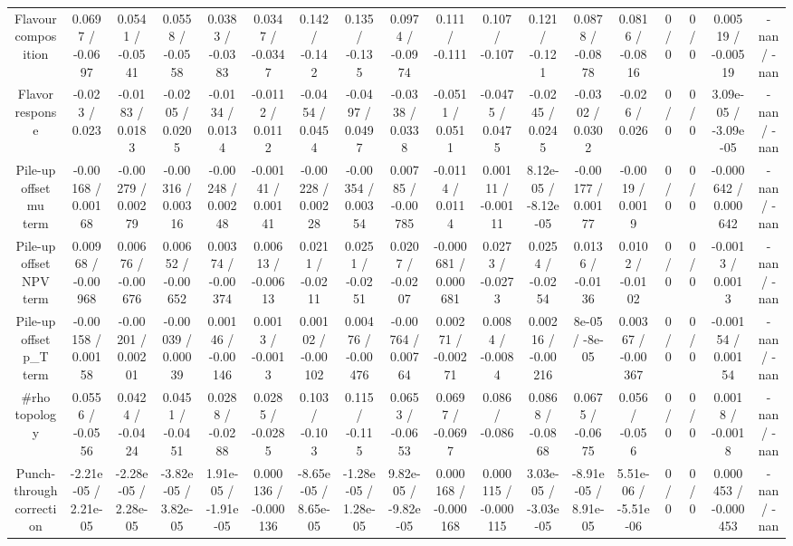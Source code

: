\documentclass[10pt]{article}
\begin{document}
\begin{table}[htbp]
\begin{center}
\begin{tabular}{|c|c|c|c|c|c|c|c|c|c|c|c|c|c|c|c|c|c|}
  Flavour composition & 0.0697 / -0.0697 & 0.0541 / -0.0541 & 0.0558 / -0.0558 & 0.0383 / -0.0383 & 0.0347 / -0.0347 & 0.142 / -0.142 & 0.135 / -0.135 & 0.0974 / -0.0974 & 0.111 / -0.111 & 0.107 / -0.107 & 0.121 / -0.121 & 0.0878 / -0.0878 & 0.0816 / -0.0816 & 0 / 0 & 0 / 0 & 0.00519 / -0.00519 & -nan / -nan \\ 
  Flavor response & -0.023 / 0.023 & -0.0183 / 0.0183 & -0.0205 / 0.0205 & -0.0134 / 0.0134 & -0.0112 / 0.0112 & -0.0454 / 0.0454 & -0.0497 / 0.0497 & -0.0338 / 0.0338 & -0.0511 / 0.0511 & -0.0475 / 0.0475 & -0.0245 / 0.0245 & -0.0302 / 0.0302 & -0.026 / 0.026 & 0 / 0 & 0 / 0 & 3.09e-05 / -3.09e-05 & -nan / -nan \\ 
  Pile-up offset mu term & -0.00168 / 0.00168 & -0.00279 / 0.00279 & -0.00316 / 0.00316 & -0.00248 / 0.00248 & -0.00141 / 0.00141 & -0.00228 / 0.00228 & -0.00354 / 0.00354 & 0.00785 / -0.00785 & -0.0114 / 0.0114 & 0.00111 / -0.00111 & 8.12e-05 / -8.12e-05 & -0.00177 / 0.00177 & -0.0019 / 0.0019 & 0 / 0 & 0 / 0 & -0.000642 / 0.000642 & -nan / -nan \\ 
  Pile-up offset NPV term & 0.00968 / -0.00968 & 0.00676 / -0.00676 & 0.00652 / -0.00652 & 0.00374 / -0.00374 & 0.00613 / -0.00613 & 0.0211 / -0.0211 & 0.0251 / -0.0251 & 0.0207 / -0.0207 & -0.000681 / 0.000681 & 0.0273 / -0.0273 & 0.0254 / -0.0254 & 0.0136 / -0.0136 & 0.0102 / -0.0102 & 0 / 0 & 0 / 0 & -0.0013 / 0.0013 & -nan / -nan \\ 
  Pile-up offset p_{T} term & -0.00158 / 0.00158 & -0.00201 / 0.00201 & -0.00039 / 0.00039 & 0.00146 / -0.00146 & 0.0013 / -0.0013 & 0.00102 / -0.00102 & 0.00476 / -0.00476 & -0.00764 / 0.00764 & 0.00271 / -0.00271 & 0.0084 / -0.0084 & 0.00216 / -0.00216 & 8e-05 / -8e-05 & 0.00367 / -0.00367 & 0 / 0 & 0 / 0 & -0.00154 / 0.00154 & -nan / -nan \\ 
  #rho topology & 0.0556 / -0.0556 & 0.0424 / -0.0424 & 0.0451 / -0.0451 & 0.0288 / -0.0288 & 0.0285 / -0.0285 & 0.103 / -0.103 & 0.115 / -0.115 & 0.0653 / -0.0653 & 0.0697 / -0.0697 & 0.086 / -0.086 & 0.0868 / -0.0868 & 0.0675 / -0.0675 & 0.056 / -0.056 & 0 / 0 & 0 / 0 & 0.0018 / -0.0018 & -nan / -nan \\ 
  Punch-through correction & -2.21e-05 / 2.21e-05 & -2.28e-05 / 2.28e-05 & -3.82e-05 / 3.82e-05 & 1.91e-05 / -1.91e-05 & 0.000136 / -0.000136 & -8.65e-05 / 8.65e-05 & -1.28e-05 / 1.28e-05 & 9.82e-05 / -9.82e-05 & 0.000168 / -0.000168 & 0.000115 / -0.000115 & 3.03e-05 / -3.03e-05 & -8.91e-05 / 8.91e-05 & 5.51e-06 / -5.51e-06 & 0 / 0 & 0 / 0 & 0.000453 / -0.000453 & -nan / -nan \\ 

\end{tabular}
\end{center}
\end{table}
\end{document}
